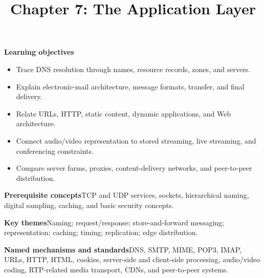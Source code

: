 \documentclass[10pt,letterpaper]{article}
\title{Chapter 7: The Application Layer}
\author{}
\date{}
\begin{document}
\maketitle
{}
\begin{overviewbox}
\textbf{Learning objectives}\begin{itemize}
  \item Trace DNS resolution through names, resource records, zones, and servers.
  \item Explain electronic-mail architecture, message formats, transfer, and final delivery.
  \item Relate URLs, HTTP, static content, dynamic applications, and Web architecture.
  \item Connect audio/video representation to stored streaming, live streaming, and conferencing constraints.
  \item Compare server farms, proxies, content-delivery networks, and peer-to-peer distribution.
\end{itemize}
\textbf{Prerequisite concepts}\quad TCP and UDP services, sockets, hierarchical naming, digital sampling, caching, and basic security concepts.\par
\textbf{Key themes}\quad Naming; request/response; store-and-forward messaging; representation; caching; timing; replication; edge distribution.\par
\textbf{Named mechanisms and standards}\quad DNS, SMTP, MIME, POP3, IMAP, URLs, HTTP, HTML, cookies, server-side and client-side processing, audio/video coding, RTP-related media transport, CDNs, and peer-to-peer systems.
\end{overviewbox}

\end{document}
